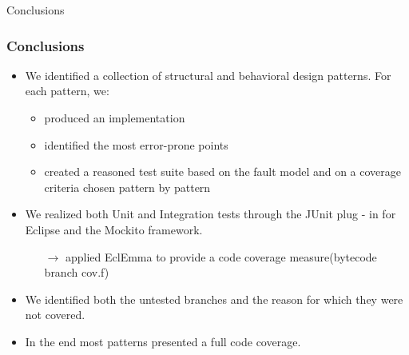 \documentclass{beamer}
\theoremstyle{definition}
\begin{document}
		
		\begin{section}{}
			\begin{subsection}{Conclusions}
				\begin{frame}
					
					\frametitle{Conclusions}
						\begin{itemize}
						\item We identified a collection of structural and behavioral design patterns. For each pattern, we:
							{\footnotesize \begin{itemize}
								\item produced an implementation
							\end{itemize} 
							\begin{itemize}
								\item identified the most error-prone points
							\end{itemize} 
								\begin{itemize}
									\vspace{-0.8mm}
									\item created a reasoned test suite based on the fault model and on a coverage criteria chosen pattern by pattern
								\end{itemize} }
						
						\item We realized both Unit and Integration tests through the JUnit plug - in for Eclipse and the Mockito framework.
								{\footnotesize \begin{itemize}
									\item[$ \rightarrow $] applied EclEmma to provide a code coverage measure(bytecode branch cov.f)
								\end{itemize}} 
								
						\item We identified both the untested branches and the reason for which they were not covered.
						
						\item In the end most patterns presented a full code coverage.
					\end{itemize}
					
				\end{frame}
			\end{subsection}
		\end{section}
\end{document}
